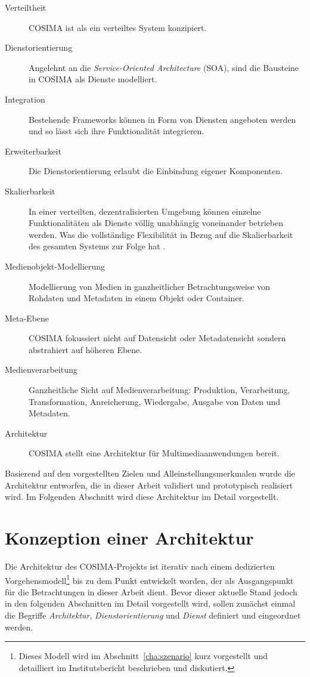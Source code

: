   \begin{description}
    \item[Verteiltheit] COSIMA ist als ein verteiltes System konzipiert.
    \item[Dienstorientierung] Angelehnt an die \emph{Service-Oriented Architecture} (SOA), sind die Bausteine in COSIMA als Dienste modelliert.
    \item[Integration] Bestehende Frameworks können in Form von Diensten angeboten werden und so lässt sich ihre Funktionalität integrieren.
    \item[Erweiterbarkeit] Die Dienstorientierung erlaubt die Einbindung eigener Komponenten.
    \item[Skalierbarkeit] In einer verteilten, dezentralisierten Umgebung können einzelne Funktionalitäten als Dienste völlig unabhängig voneinander betrieben werden. Was die vollständige Flexibilität in Bezug auf die Skalierbarkeit des gesamten Systems zur Folge hat \citep[S. 294]{web_services_principles_and_technology}.
    \item[Medienobjekt-Modellierung] Modellierung von Medien in ganzheitlicher Betrachtungsweise von Rohdaten und Metadaten in einem Objekt oder Container.
    \item[Meta-Ebene] COSIMA fokussiert nicht auf Datensicht oder Metadatensicht sondern abstrahiert auf höheren Ebene.
    \item[Medienverarbeitung] Ganzheitliche Sicht auf Medienverarbeitung: Produktion, Verarbeitung, Transformation, Anreicherung, Wiedergabe, Ausgabe von Daten und Metadaten.
    \item[Architektur] COSIMA stellt eine Architektur für Multimediaanwendungen bereit.
  \end{description}
  
  Basierend auf den vorgestellten Zielen und Alleinstellungsmerkmalen wurde die Architektur entworfen, die in dieser Arbeit validiert und prototypisch realisiert wird. Im Folgenden Abschnitt wird diese Architektur im Detail vorgestellt.


\section{Konzeption einer Architektur} %
\label{sec:architektur}

  Die Architektur des COSIMA-Projekts ist iterativ nach einem dedizierten Vorgehensmodell\footnote{Dieses Modell wird im Abschnitt~\ref{cha:szenario} kurz vorgestellt und detailliert im Institutsbericht \citep[S. 7ff]{bericht} beschrieben und diskutiert.} bis zu dem Punkt entwickelt worden, der als Ausgangspunkt für die Betrachtungen in dieser Arbeit dient. Bevor dieser aktuelle Stand jedoch in den folgenden Abschnitten im Detail vorgestellt wird, sollen zunächst einmal die Begriffe \emph{Architektur}, \emph{Dienstorientierung} und \emph{Dienst} definiert und eingeordnet werden.
  
